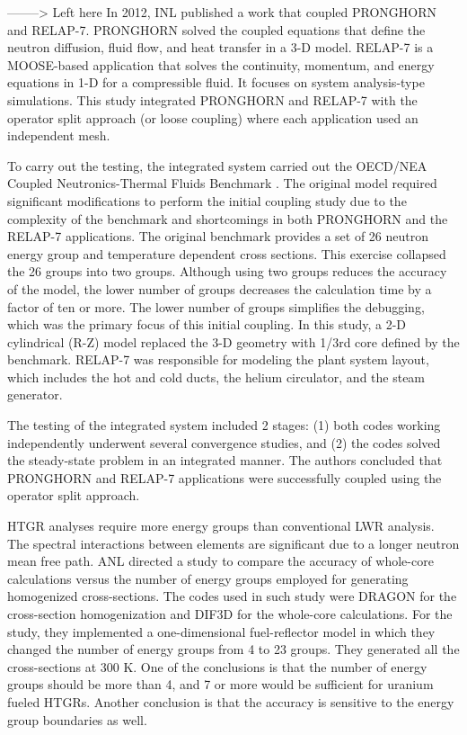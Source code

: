 \documentclass[11pt,letterpaper]{article}
\begin{document}
--------> Left here
In 2012, \gls{INL} published a work \cite{j_ortensi_initial_2012} that coupled PRONGHORN and RELAP-7.
PRONGHORN solved the coupled equations that define the neutron diffusion, fluid flow, and heat transfer in a 3-D  model.
RELAP-7 is a MOOSE-based application that solves the continuity, momentum, and energy equations in 1-D for a compressible fluid.
It focuses on system analysis-type simulations.
This study integrated PRONGHORN and RELAP-7 with the operator split approach (or loose coupling) where each application used an independent mesh.

To carry out the testing, the integrated system carried out the OECD/NEA Coupled Neutronics-Thermal Fluids Benchmark \cite{oecd_nea_benchmark_2017}.
The original model required significant modifications to perform the initial coupling study due to the complexity of the benchmark and shortcomings in both PRONGHORN and the RELAP-7 applications.
The original benchmark provides a set of 26 neutron energy group and temperature dependent cross sections.
This exercise collapsed the 26 groups into two groups.
Although using two groups reduces the accuracy of the model, the lower number of groups decreases the calculation time by a factor of ten or more.
The lower number of groups simplifies the debugging, which was the primary focus of this initial coupling.
In this study, a 2-D cylindrical (R-Z) model replaced the 3-D geometry with 1/3rd core defined by the benchmark.
RELAP-7 was responsible for modeling the plant system layout, which includes the hot and cold ducts, the helium circulator, and the steam generator.

The testing of the integrated system included 2 stages: (1) both codes working independently underwent several convergence studies, and (2) the codes solved the steady-state problem in an integrated manner.
The authors concluded that PRONGHORN and RELAP-7 applications were successfully coupled using the operator split approach.





\gls{HTGR} analyses require more energy groups than conventional \gls{LWR} analysis.
The spectral interactions between elements are significant due to a longer neutron mean free path.
\gls{ANL} directed a study \cite{lee_status_2006} to compare the accuracy of whole-core calculations versus the number of energy groups employed for generating homogenized cross-sections.
The codes used in such study were DRAGON for the cross-section homogenization and DIF3D for the whole-core calculations.
For the study, they implemented a one-dimensional fuel-reflector model in which they changed the number of energy groups from 4 to 23 groups.
They generated all the cross-sections at 300 K.
One of the conclusions is that the number of energy groups should be more than 4, and 7 or more would be sufficient for uranium fueled \glspl{HTGR}.
Another conclusion is that the accuracy is sensitive to the energy group boundaries as well.
\end{document}
